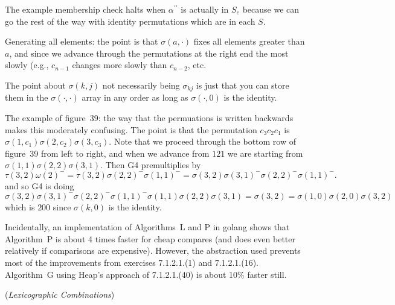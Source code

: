 The example membership check halts when $\alpha^{\prime\prime}$
is actually in $S_e$ because we can go the rest of the way with
identity permutations which are in each $S$.

 Generating all elements: the point is that 
$\sigma\left(a, \cdot\right)$ fixes all elements greater than $a$,
and since we advance through the permutations at the right end
the most slowly (e.g., $c_{n-1}$ changes more slowly than $c_{n-2}$,
etc.


\noindent [p 328] The point about $\sigma\left(k, j\right)$ not
necessarily being $\sigma_{kj}$ is just that you can store them in
the $\sigma\left(\cdot, \cdot\right)$ array in any order as long
as $\sigma\left(\cdot, 0\right)$ is the identity.

 The example of figure~39: the way that the
permuations is written backwards makes this moderately confusing.
The point is that the permutation $c_3 c_2 c_1$ is
$\sigma\left(1, c_1\right) \sigma\left(2, c_2\right) \sigma\left(3, c_3\right)$.
Note that we proceed through the bottom row of figure~39 from left
to right, and when we advance from $121$ we are starting from
$\sigma\left(1, 1\right) \sigma\left(2, 2\right) \sigma\left(3, 1\right)$.
Then G4 premultiplies by 
$$
 \tau\left(3, 2\right) \omega\left(2\right)^{-} = 
  \tau\left(3, 2\right) \sigma\left(2, 2\right)^{-} \sigma\left(1, 1\right)^{-} =
  \sigma\left(3, 2\right) \sigma\left(3, 1\right)^{-} \sigma\left(2, 2\right)^{-} 
  \sigma\left(1, 1\right)^{-} .
$$
and so G4 is doing 
$$
\sigma\left(3, 2\right) \sigma\left(3, 1\right)^{-} \sigma\left(2, 2\right)^{-} 
  \sigma\left(1, 1\right)^{-} \sigma\left(1, 1\right) \sigma\left(2, 2\right) \sigma\left(3, 1\right)
  = \sigma\left(3, 2\right) = \sigma\left(1, 0\right) \sigma\left(2, 0\right) \sigma\left(3, 2\right)
$$
which is $200$ since $\sigma\left(k, 0\right)$ is the identity.
 
\hfil\break
Incidentally, an implementation of Algorithms~L and P
in golang shows that Algorithm~P is about 4 times faster
for cheap compares (and does even better relatively
if comparisons are expensive).  However, the abstraction
used prevents most of the improvements from exercises
7.1.2.1.(1) and 7.1.2.1.(16).  Algorithm~G using Heap's
approach of 7.1.2.1.(40) is about 10\% faster still.


 ({\it Lexicographic Combinations})\hfil\break

